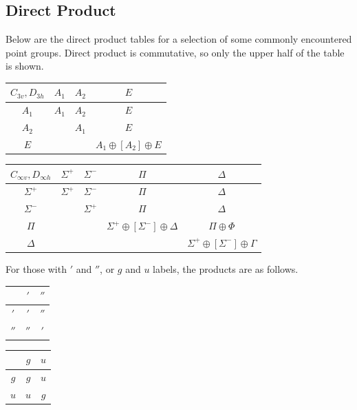 \documentclass{article}
\theoremstyle{plain}\theoremheaderfont{\normalfont\itshape}\theorembodyfont{\rmfamily}\theoremseparator{.}\newtheorem*{rem}{Remark}\newtheorem*{ex}{Example}\newtheorem*{proof}{Proof}\newtheorem*{altp}{Alternative proof}
\theoremstyle{plain}\theoremheaderfont{\normalfont\bfseries}\theorembodyfont{\rmfamily}\theoremseparator{.}\newtheorem{thm}{Theorem}[section]\newtheorem{lem}[thm]{Lemma}\newtheorem{prop}[thm]{Proposition}\newtheorem*{cor}{Corollary}\newtheorem{defn}[thm]{Definition}\newtheorem{clm}[thm]{Claim}\newtheorem{clminproof}{Claim}\newtheorem{pos}{Postulate}[section]
\theoremstyle{break}\theoremheaderfont{\normalfont\itshape}\theorembodyfont{\rmfamily}\theoremseparator{.\medskip}\newtheorem*{proofskip}{Proof}\newtheorem*{exs}{Examples}\newtheorem*{rems}{Remarks}
\theoremstyle{break}\theoremheaderfont{\normalfont\bfseries}\theorembodyfont{\rmfamily}\theoremseparator{.\medskip}\newtheorem{lemskip}[thm]{Lemma}\newtheorem{defnskip}[thm]{Definition}\newtheorem{propskip}[thm]{Proposition}\newtheorem{thmskip}[thm]{Theorem}
\numberwithin{equation}{section}
\begin{document}
    \subsection{Direct Product}\label{Chap:direct_product}
    Below are the direct product tables for a selection of some commonly encountered point groups. Direct product is commutative, so only the upper half of the table is shown.
    \begin{table}[ht!]
        \centering
        \begin{tabular}{c|ccc}
            \toprule
            \(C_{3v},D_{3h}\) & \(A_1\) & \(A_2\) & \(E\) \\ \midrule
            \(A_1\) & \(A_1\) & \(A_2\) & \(E\) \\
            \(A_2\) & ~ & \(A_1\) & \(E\) \\
            \(E\) & ~ & ~ & \(A_1\oplus[A_2]\oplus E\) \\ \bottomrule
        \end{tabular}
    \end{table}
    \begin{table}[ht!]
        \centering
        \begin{tabular}{c|cccc}
            \toprule
            \(C_{\infty v}, D_{\infty h}\) & \(\Sigma^+\) & \(\Sigma^-\) & \(\Pi\) & \(\Delta\) \\ \midrule
            \(\Sigma^+\) & \(\Sigma^+\) & \(\Sigma^-\) & \(\Pi\) & \(\Delta\) \\
            \(\Sigma^-\) & ~ & \(\Sigma^+\) & \(\Pi\) & \(\Delta\) \\
            \(\Pi\) & ~ & ~ & \(\Sigma^+ \oplus[\Sigma^-]\oplus\Delta\) & \(\Pi\oplus\Phi\) \\
            \(\Delta\) & ~ & ~ & ~ & \(\Sigma^+ \oplus[\Sigma^-]\oplus\Gamma\) \\ \bottomrule
        \end{tabular}
    \end{table}

    For those with \('\) and \(''\), or \(g\) and \(u\) labels, the products are as follows.
    \begin{table}[ht!]
        \centering
        \hfill
        \begin{tabular}{c|cc}
            \toprule
            ~ & \('\) & \(''\) \\ \midrule
            \('\) & \('\) & \(''\) \\
            \(''\) & \(''\) & \('\) \\
            \bottomrule
        \end{tabular}
        \hfill
        \begin{tabular}{c|cc}
            \toprule
            ~ & \(g\) & \(u\) \\ \midrule
            \(g\) & \(g\) & \(u\) \\
            \(u\) & \(u\) & \(g\) \\
            \bottomrule
        \end{tabular}
        \hfill\(\,\)
    \end{table}
\end{document}

